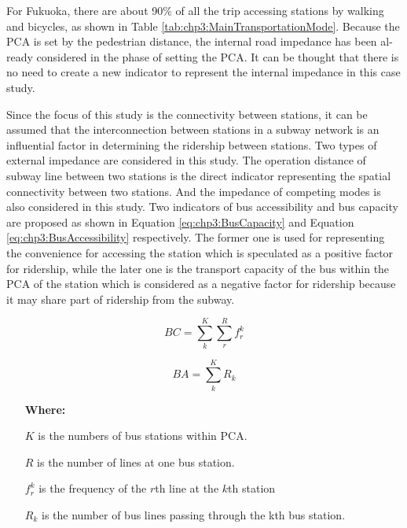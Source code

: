 %
For Fukuoka, there are about 90\% of all the trip accessing stations by walking and bicycles, as shown in Table \ref{tab:chp3:MainTransportationMode}. Because the PCA is set by the pedestrian distance, the internal road impedance has been al-ready considered in the phase of setting the PCA. It can be thought that there is no need to create a new indicator to represent the internal impedance in this case study.

%
Since the focus of this study is the connectivity between stations, it can be assumed that the interconnection between stations in a subway network is an influential factor in determining the ridership between stations. Two types of external impedance are considered in this study. The operation distance of subway line between two stations is the direct indicator representing the spatial connectivity between two stations. And the impedance of competing modes is also considered in this study. Two indicators of bus accessibility and bus capacity are proposed as shown in Equation \ref{eq:chp3:BusCapacity} and Equation \ref{eq:chp3:BusAccessibility} respectively. The former one is used for representing the convenience for accessing the station which is speculated as a positive factor for ridership, while the later one is the transport capacity of the bus within the PCA of the station which is considered as a negative factor for ridership because it may share part of ridership from the subway.

\begin{equation}
	BC=\sum_{k}^{K}\sum_{r}^{R}f_{r}^{k}
	\label{eq:chp3:BusCapacity}
\end{equation}

\begin{equation}
	BA=\sum_{k}^{K}R_{k}
	\label{eq:chp3:BusAccessibility}
\end{equation}

\begin{enumerate}
	\item[\textbf{Where:}]
	\item[$K$] is the numbers of bus stations within PCA.
	\item[$R$] is the number of lines at one bus station.
	\item[$f_{r}^{k}$] is the frequency of the $r$th line at the $k$th station
	\item[$R_k$] is the number of bus lines passing through the kth bus station.
\end{enumerate}

